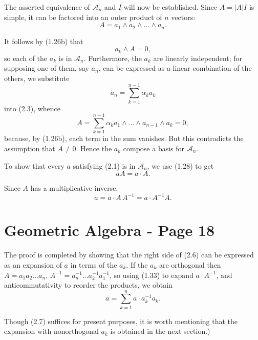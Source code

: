 \documentclass[fleqn]{scrartcl}
\numberwithin{equation}{section}
\begin{document}
\vspace{1em}
\noindent The asserted equivalence of \(\mathscr{A}_n\) and \(I\) will now be established. Since \(A = |A|I\) is simple, it can be factored into an outer product of \(n\) vectors:
\begin{equation}
A = a_1 \wedge a_2 \wedge \dots \wedge a_n. \tag{2.3}
\end{equation}

\noindent It follows by (1.26b) that
\begin{equation}
a_k \wedge A = 0, \tag{2.4}
\end{equation}
so each of the \(a_k\) is in \(\mathscr{A}_n\). Furthermore, the \(a_k\) are linearly independent; for supposing one of them, say \(a_n\), can be expressed as a linear combination of the others, we substitute
\[
a_n = \sum_{k=1}^{n-1} \alpha_k a_k
\]
into (2.3), whence
\[
A = \sum_{k=1}^{n-1} \alpha_k a_1 \wedge \dots \wedge a_{n-1} \wedge a_k = 0,
\]
because, by (1.26b), each term in the sum vanishes. But this contradicts the assumption that \(A \neq 0\). Hence the \(a_k\) compose a basis for \(\mathscr{A}_n\).

\vspace{1em}
\noindent To show that every \(a\) satisfying (2.1) is in \(\mathscr{A}_n\), we use (1.28) to get
\begin{equation}
aA = a \cdot A. \tag{2.5}
\end{equation}

\noindent Since \(A\) has a multiplicative inverse,
\begin{equation}
a = a \cdot A \, A^{-1} = a \cdot A^{-1} A. \tag{2.6}
\end{equation}

\section*{Geometric Algebra - Page 18}

\noindent The proof is completed by showing that the right side of (2.6) can be expressed as an expansion of \(a\) in terms of the \(a_k\). If the \(a_k\) are orthogonal then \(A = a_1 a_2 \dots a_n\), \(A^{-1} = a_n^{-1} \dots a_2^{-1} a_1^{-1}\), so using (1.33) to expand \(a \cdot A^{-1}\), and anticommutativity to reorder the products, we obtain
\begin{equation}
a = \sum_{k=1}^n a \cdot a_k^{-1} a_k. \tag{2.7}
\end{equation}

\noindent Though (2.7) suffices for present purposes, it is worth mentioning that the expansion with nonorthogonal \(a_k\) is obtained in the next section.)
\end{document}
